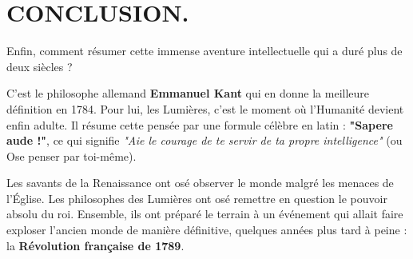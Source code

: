\documentclass[12pt, a4paper]{article}
\begin{document}
\section*{CONCLUSION.}

Enfin, comment résumer cette immense aventure intellectuelle qui a duré plus de deux siècles ? 

C'est le philosophe allemand \textbf{Emmanuel Kant} qui en donne la meilleure définition en 1784. Pour lui, les Lumières, c'est le moment où l'Humanité devient enfin adulte. Il résume cette pensée par une formule célèbre en latin : \textbf{"Sapere aude !"}, ce qui signifie \textit{"Aie le courage de te servir de ta propre intelligence"} (ou Ose penser par toi-même).

Les savants de la Renaissance ont osé observer le monde malgré les menaces de l'Église. Les philosophes des Lumières ont osé remettre en question le pouvoir absolu du roi. Ensemble, ils ont préparé le terrain à un événement qui allait faire exploser l'ancien monde de manière définitive, quelques années plus tard à peine : la \textbf{Révolution française de 1789}.
\end{document}
